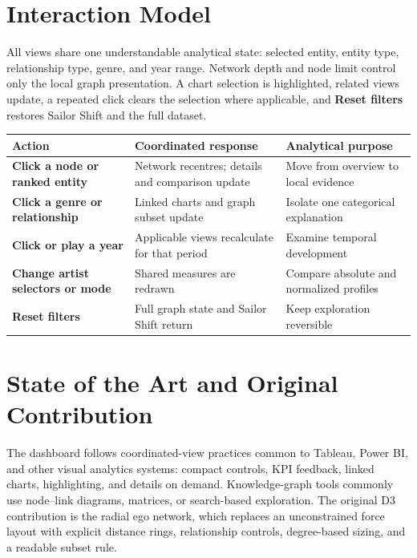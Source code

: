 \documentclass[9pt,a4paper]{article}
\begin{document}
\section{Interaction Model}
All views share one understandable analytical state: selected entity, entity type, relationship type, genre, and year range. Network depth and node limit control only the local graph presentation. A chart selection is highlighted, related views update, a repeated click clears the selection where applicable, and \textbf{Reset filters} restores Sailor Shift and the full dataset.

\begin{table}[H]\centering\small
\begin{tabularx}{\textwidth}{>{\bfseries}p{2.7cm} >{\raggedright\arraybackslash}X >{\raggedright\arraybackslash}X}
\toprule
Action & Coordinated response & Analytical purpose \\
\midrule
Click a node or ranked entity & Network recentres; details and comparison update & Move from overview to local evidence \\
Click a genre or relationship & Linked charts and graph subset update & Isolate one categorical explanation \\
Click or play a year & Applicable views recalculate for that period & Examine temporal development \\
Change artist selectors or mode & Shared measures are redrawn & Compare absolute and normalized profiles \\
Reset filters & Full graph state and Sailor Shift return & Keep exploration reversible \\
\bottomrule
\end{tabularx}
\end{table}

\section{State of the Art and Original Contribution}
The dashboard follows coordinated-view practices common to Tableau, Power BI, and other visual analytics systems: compact controls, KPI feedback, linked charts, highlighting, and details on demand. Knowledge-graph tools commonly use node--link diagrams, matrices, or search-based exploration. The original D3 contribution is the radial ego network, which replaces an unconstrained force layout with explicit distance rings, relationship controls, degree-based sizing, and a readable subset rule.

\clearpage
\end{document}
